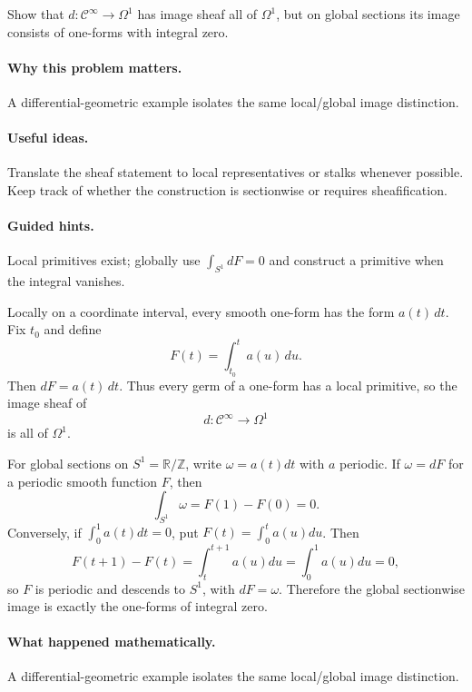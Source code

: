 \begin{problem}\label{prob:vi15-p17}
Show that $d:\mathcal C^\infty\to\Omega^1$ has image sheaf all of $\Omega^1$, but on global sections its image consists of one-forms with integral zero.
\end{problem}

\ifdefined\FullProblemDossiers
\paragraph{Why this problem matters.}
A differential-geometric example isolates the same local/global image distinction.

\paragraph{Useful ideas.}
Translate the sheaf statement to local representatives or stalks whenever possible.  Keep track of whether the construction is sectionwise or requires sheafification.

\paragraph{Guided hints.}
Local primitives exist; globally use $\int_{S^1}dF=0$ and construct a primitive when the integral vanishes.

\begin{solution}
Locally on a coordinate interval, every smooth one-form has the form $a(t)\,dt$. Fix $t_0$ and define
\[
F(t)=\int_{t_0}^t a(u)\,du.
\]
Then $dF=a(t)\,dt$. Thus every germ of a one-form has a local primitive, so the image sheaf of
\[
d:\mathcal C^\infty\to\Omega^1
\]
is all of $\Omega^1$.

For global sections on $S^1=\mathbb R/\mathbb Z$, write $\omega=a(t)dt$ with $a$ periodic. If $\omega=dF$ for a periodic smooth function $F$, then
\[
\int_{S^1}\omega=F(1)-F(0)=0.
\]
Conversely, if $\int_0^1a(t)dt=0$, put $F(t)=\int_0^t a(u)du$. Then
\[
F(t+1)-F(t)=\int_t^{t+1}a(u)du=\int_0^1a(u)du=0,
\]
so $F$ is periodic and descends to $S^1$, with $dF=\omega$. Therefore the global sectionwise image is exactly the one-forms of integral zero.
\end{solution}

\paragraph{What happened mathematically.}
A differential-geometric example isolates the same local/global image distinction.

